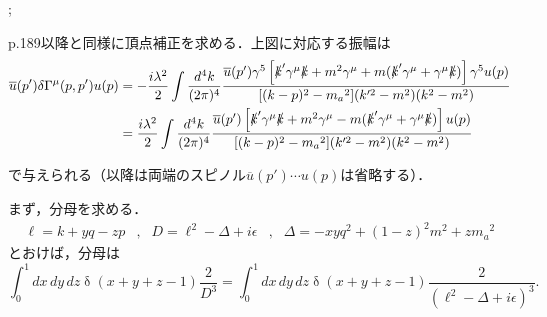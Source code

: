 \begin{center}
  ;
\end{center}

p.189以降と同様に頂点補正を求める．上図に対応する振幅は
\[
\]
\begin{align*}
  \overline{u}(p') \delta\Gamma^\mu(p, p') u(p) &= -\frac{i\lambda^2}{2} \int \frac{d^4k}{(2\pi)^4}
  \frac{\overline{u}(p') \gamma^5 \left[ \slashed{k}' \gamma^\mu \slashed{k} + m^2\gamma^\mu + m(\slashed{k}' \gamma^\mu + \gamma^\mu \slashed{k}) \right] \gamma^5 u(p)}
  {[(k-p)^2 - m_a{}^2](k'^2 - m^2)(k^2 - m^2)} \\
  &= \frac{i\lambda^2}{2} \int \frac{d^4k}{(2\pi)^4}
  \frac{\overline{u}(p') \left[ \slashed{k}' \gamma^\mu \slashed{k} + m^2\gamma^\mu - m(\slashed{k}' \gamma^\mu + \gamma^\mu \slashed{k}) \right] u(p)}
  {[(k-p)^2 - m_a{}^2](k'^2 - m^2)(k^2 - m^2)}
\end{align*}

で与えられる（以降は両端のスピノル$\overline{u}(p') \cdots u(p)$は省略する）．

まず，分母を求める．
\begin{align*}
  \ell = k + yq - zp & , & D = \ell^2 - \Delta + i\epsilon & , & \Delta = -xyq^2 + (1-z)^2 m^2 +zm_a{}^2
\end{align*}
とおけば，分母は
\[ \int_0^1 dx \, dy \, dz  \mathop\delta(x+y+z-1) \frac{2}{D^3} = \int_0^1 dx \, dy \, dz  \mathop\delta(x+y+z-1) \frac{2}{(\ell^2 - \Delta + i\epsilon)^3} . \]

